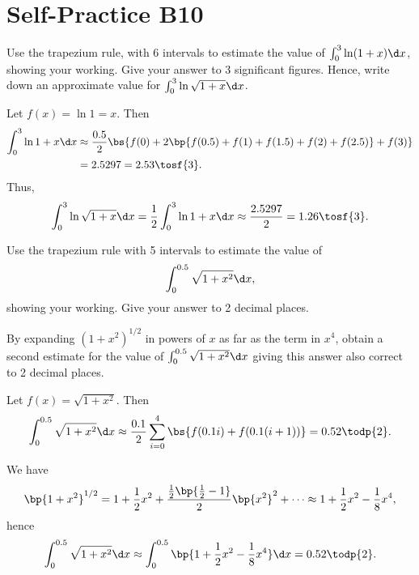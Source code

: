 \section{Self-Practice B10}

\begin{problem}
    Use the trapezium rule, with 6 intervals to estimate the value of $\int_{0}^{3}\ln(1+x) \d x$, showing your working. Give your answer to 3 significant figures. Hence, write down an approximate value for $\int_{0}^{3}\ln\sqrt{1+x} \d x$.
\end{problem}
\begin{solution}
    Let $f(x) = \ln{1 = x}$. Then
    \begin{align*}
        \int_0^3 \ln{1 + x} \d x &\approx \frac{0.5}{2}\bs{f(0) + 2\bp{f(0.5) + f(1) + f(1.5) + f(2) + f(2.5)} + f(3)}\\
        &= 2.5297 = 2.53 \tosf{3}.
    \end{align*}
    Thus, \[\int_0^3 \ln \sqrt{1 + x} \d x = \frac12 \int_0^3 \ln{1 + x} \d x \approx \frac{2.5297}2 = 1.26 \tosf{3}.\]
\end{solution}

\begin{problem}
    Use the trapezium rule with 5 intervals to estimate the value of \[\int_{0}^{0.5}\sqrt{1+x^{2}} \d x,\] showing your working. Give your answer to 2 decimal places.

    By expanding $(1+x^{2})^{1/2}$ in powers of $x$ as far as the term in $x^{4}$, obtain a second estimate for the value of $\int_{0}^{0.5}\sqrt{1+x^{2}} \d x$ giving this answer also correct to 2 decimal places.
\end{problem}
\begin{solution}
    Let $f(x) = \sqrt{1 + x^2}$. Then \[\int_0^{0.5} \sqrt{1 + x^2} \d x \approx \frac{0.1}{2} \sum_{i = 0}^4 \bs{f(0.1i) + f(0.1(i+1))} = 0.52 \todp{2}.\]

    We have \[\bp{1 + x^2}^{1/2} = 1 + \frac12 x^2 + \frac{\frac12 \bp{\frac12 -1}}{2} \bp{x^2}^2 + \dots \approx 1 + \frac12 x^2 - \frac18 x^4,\] hence \[\int_0^{0.5} \sqrt{1 + x^2} \d x \approx \int_0^{0.5} \bp{1 + \frac12 x^2 - \frac18 x^4} \d x = 0.52 \todp{2}.\]
\end{solution}

